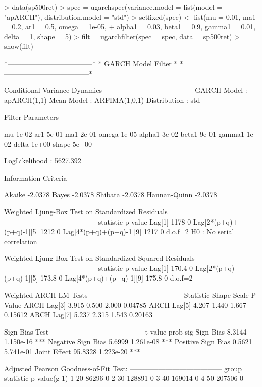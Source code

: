 \begin{Schunk}
\begin{Sinput}
> data(sp500ret)
> spec = ugarchspec(variance.model = list(model = "apARCH"), distribution.model = "std")
> setfixed(spec) <- list(mu = 0.01, ma1 = 0.2, ar1 = 0.5, omega = 1e-05,
+     alpha1 = 0.03, beta1 = 0.9, gamma1 = 0.01, delta = 1, shape = 5)
> filt = ugarchfilter(spec = spec, data = sp500ret)
> show(filt)
\end{Sinput}
\begin{Soutput}
*------------------------------------*
*          GARCH Model Filter        *
*------------------------------------*

Conditional Variance Dynamics
--------------------------------------
GARCH Model	: apARCH(1,1)
Mean Model	: ARFIMA(1,0,1)
Distribution	: std

Filter Parameters
---------------------------------------

mu     1e-02
ar1    5e-01
ma1    2e-01
omega  1e-05
alpha1 3e-02
beta1  9e-01
gamma1 1e-02
delta  1e+00
shape  5e+00

LogLikelihood : 5627.392

Information Criteria
---------------------------------------

Akaike       -2.0378
Bayes        -2.0378
Shibata      -2.0378
Hannan-Quinn -2.0378

Weighted Ljung-Box Test on Standardized Residuals
---------------------------------------
                        statistic p-value
Lag[1]                       1178       0
Lag[2*(p+q)+(p+q)-1][5]      1212       0
Lag[4*(p+q)+(p+q)-1][9]      1217       0
d.o.f=2
H0 : No serial correlation

Weighted Ljung-Box Test on Standardized Squared Residuals
---------------------------------------
                        statistic p-value
Lag[1]                      170.4       0
Lag[2*(p+q)+(p+q)-1][5]     173.8       0
Lag[4*(p+q)+(p+q)-1][9]     175.8       0
d.o.f=2

Weighted ARCH LM Tests
---------------------------------------
            Statistic Shape Scale P-Value
ARCH Lag[3]     3.915 0.500 2.000 0.04785
ARCH Lag[5]     4.207 1.440 1.667 0.15612
ARCH Lag[7]     5.237 2.315 1.543 0.20163


Sign Bias Test
---------------------------------------
                   t-value      prob sig
Sign Bias           8.3144 1.150e-16 ***
Negative Sign Bias  5.6999 1.261e-08 ***
Positive Sign Bias  0.5621 5.741e-01
Joint Effect       95.8328 1.223e-20 ***


Adjusted Pearson Goodness-of-Fit Test:
---------------------------------------
  group statistic p-value(g-1)
1    20     86296            0
2    30    128891            0
3    40    169014            0
4    50    207506            0
\end{Soutput}
\end{Schunk}
